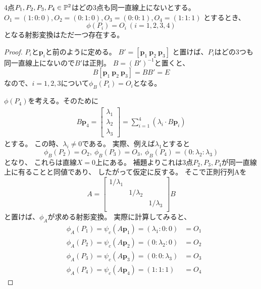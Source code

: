 \documentclass[a4paper]{jsarticle}
\begin{document}
\begin{Prop}
    4点$P_1, P_2, P_3, P_4 \in \mathbb{P}^2$はどの3点も同一直線上にないとする。
    $O_1=(1:0:0), O_2=(0:1:0), O_3=(0:0:1), O_4=(1:1:1)$
    とするとき、
    \[ \phi(P_i)=O_i ~(i=1,2,3,4)\]
    となる射影変換はただ一つ存在する。
\end{Prop}
\begin{proof}
    $P_i$と$\mathbf{p}_i$と前のように定める。
    $B'=[\mathbf{p}_1~\mathbf{p}_2~\mathbf{p}_3]$
    と置けば、$P_i$はどの3つも同一直線上にないので$B'$は正則。
    $B=(B')^{-1}$と置くと、
    \[ B[\mathbf{p}_1~\mathbf{p}_2~\mathbf{p}_3]=B B'=E \]
    なので、$i=1,2,3$について$\phi_B(P_i)=O_i$となる。

    $\phi(P_4)$を考える。そのために
    \begin{gather}
    B \mathbf{p}_4=
    \begin{bmatrix}
        \lambda_1 \\ \lambda_2 \\ \lambda_3
    \end{bmatrix}
    =\sum_{i=1}^{4}{(\lambda_i \cdot B \mathbf{p}_i)} \label{astarisk}
    \end{gather}
    とする。
    この時、$\lambda_i \neq 0$である。
    実際、例えば$\lambda_1$とすると
    \[ \phi_B(P_2)=O_2,~ \phi_B(P_3)=O_3,~ \phi_B(P_4)=(0:\lambda_2:\lambda_3) \]となり、
    これらは直線$X=0$上にある。
    補題よりこれは3点$P_2, P_3,P_4$が同一直線上に有ることと同値であり、
    したがって仮定に反する。
    そこで正則行列Aを
    \[
    A=
    \begin{bmatrix}
        1/\lambda_1& {}& {} \\
        {}& 1/\lambda_2& {} \\
        {}& {}& 1/\lambda_3 \\
    \end{bmatrix}
    B
    \]
    と置けば、$\phi_A$が求める射影変換。
    実際に計算してみると、
    \begin{eqnarray*}
        &\phi_A(P_1)=\psi_{c}(A \mathbf{p}_1)=(\lambda_1:0:0)&=O_1 \\
        &\phi_A(P_2)=\psi_{c}(A \mathbf{p}_2)=(0:\lambda_2:0)&=O_2 \\
        &\phi_A(P_3)=\psi_{c}(A \mathbf{p}_3)=(0:0:\lambda_3)&=O_3 \\
        &\phi_A(P_4)=\psi_{c}(A \mathbf{p}_4)=(1 : 1: 1)    ~&=O_4
    \end{eqnarray*}


\end{proof}
\end{document}

